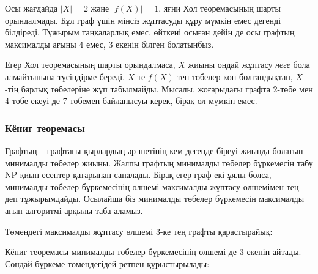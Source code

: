 Осы жағдайда $|X|=2$ және $|f(X)|=1$,
яғни Хол теоремасының шарты орындалмады.
Бұл граф үшін мінсіз жұптасуды құру мүмкін 
емес дегенді білдіреді. Тұжырым таңқаларлық емес, өйткені
осыған дейін де осы графтың максималды 
ағыны 4 емес, 3 екенін білген болатынбыз. 

Егер Хол теоремасының шарты орындалмаса,
$X$ жиыны ондай жұптасу \emph{неге} бола алмайтынына
түсіндірме береді. $X$-те $f(X)$-тен төбелер 
көп болғандықтан, $X$-тің барлық төбелеріне жұп 
табылмайды. Мысалы, жоғарыдағы графта 2-төбе мен 4-төбе
екеуі де 7-төбемен байланысуы керек, бірақ ол мүмкін емес. 

\subsubsection{Кёниг теоремасы}


Графтың  -- графтағы
қырлардың әр шетінің кем дегенде біреуі
жиында болатын
минималды төбелер жиыны.
Жалпы графтың минималды төбелер бүркемесін 
табу NP-қиын есептер қатарынан саналады. Бірақ егер граф екі ұялы болса,
 минималды төбелер бүркемесінің өлшемі
максималды жұптасу өлшемімен тең деп тұжырымдайды.
Осылайша біз минималды төбелер бүркемесін максималды ағын
алгоритмі арқылы таба аламыз. 


Төмендегі максималды жұптасу өлшемі 3-ке тең
графты қарастырайық:
\begin{center}
\end{center}
Кёниг теоремасы минималды төбелер бүркемесінің
өлшемі де 3 екенін айтады. 
Сондай бүркеме төмендегідей ретпен құрыстырылады:


